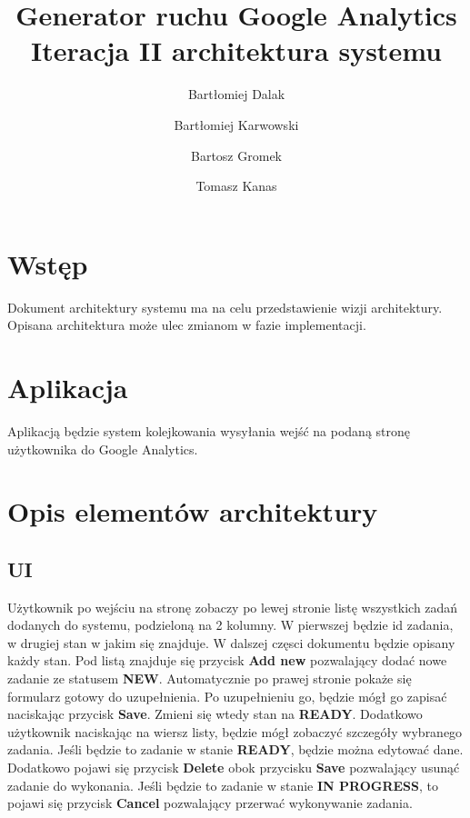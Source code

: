 \documentclass{article}
\title{Generator ruchu Google Analytics \\ Iteracja II architektura systemu}
\author{Bartłomiej Dalak \and Bartłomiej Karwowski \and Bartosz Gromek \and Tomasz Kanas}
\begin{document}
\maketitle

\section{Wstęp}

Dokument architektury systemu ma na celu przedstawienie wizji architektury. Opisana architektura może ulec zmianom w fazie implementacji.

\section{Aplikacja}

Aplikacją będzie system kolejkowania wysyłania wejść na podaną stronę użytkownika do Google Analytics.

\section{Opis elementów architektury}

\subsection{UI}
Użytkownik po wejściu na stronę zobaczy po lewej stronie listę wszystkich zadań dodanych do systemu, podzieloną na 2 kolumny. W pierwszej będzie id zadania, w drugiej stan w jakim się znajduje. W dalszej częsci dokumentu będzie opisany każdy stan. Pod listą znajduje się przycisk \textbf{Add new} pozwalający dodać nowe zadanie ze statusem \textbf{NEW}. Automatycznie po prawej stronie pokaże się formularz gotowy do uzupełnienia. Po uzupełnieniu go, będzie mógł go zapisać naciskając przycisk \textbf{Save}. Zmieni się wtedy stan na \textbf{READY}. Dodatkowo użytkownik naciskając na wiersz listy, będzie mógł zobaczyć szczegóły wybranego zadania. Jeśli będzie to zadanie w stanie \textbf{READY}, będzie można edytować dane. Dodatkowo pojawi się przycisk \textbf{Delete} obok przycisku \textbf{Save} pozwalający usunąć zadanie do wykonania. Jeśli będzie to zadanie w stanie \textbf{IN PROGRESS}, to pojawi się przycisk \textbf{Cancel} pozwalający przerwać wykonywanie zadania. 
\end{document}
